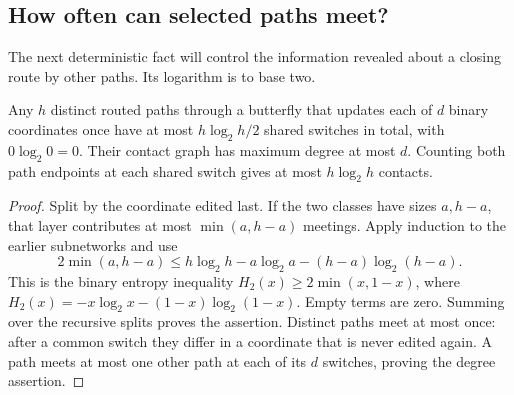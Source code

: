\subsection{How often can selected paths meet?}
The next deterministic fact will control the information revealed about a closing route by other paths. Its logarithm is to base two.
\begin{lemma}\label{net:encounters}\label{n:butterfly-contacts}
Any $h$ distinct routed paths through a butterfly that updates each of $d$ binary coordinates once have at most $h\log_2h/2$ shared switches in total, with $0\log_2 0=0$. Their contact graph has maximum degree at most $d$. Counting both path endpoints at each shared switch gives at most $h\log_2h$ contacts.
\end{lemma}
\begin{proof}
Split by the coordinate edited last. If the two classes have sizes $a,h-a$, that layer contributes at most $\min(a,h-a)$ meetings. Apply induction to the earlier subnetworks and use
\[
 2\min(a,h-a)\le h\log_2h-a\log_2a-(h-a)\log_2(h-a).
\]
This is the binary entropy inequality $H_2(x)\ge2\min(x,1-x)$, where $H_2(x)=-x\log_2x-(1-x)\log_2(1-x)$. Empty terms are zero. Summing over the recursive splits proves the assertion. Distinct paths meet at most once: after a common switch they differ in a coordinate that is never edited again. A path meets at most one other path at each of its $d$ switches, proving the degree assertion.
\end{proof}

